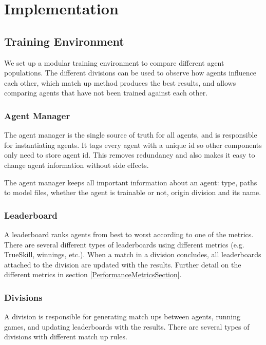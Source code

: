 \chapter{Implementation}

\section{Training Environment}
We set up a modular training environment to compare different agent populations. The different divisions can be used to observe how agents influence each other, which match up method produces the best results, and allows comparing agents that have not been trained against each other. 

\subsection{Agent Manager}
The agent manager is the  single source of truth for all agents, and is responsible for instantiating agents. It tags every agent with a unique id so other components only need to store agent id. This removes redundancy and also makes it easy to change agent information without side effects.

The agent manager keeps all important information about an agent: type, paths to model files, whether the agent is trainable or not, origin division and its name.

\subsection{Leaderboard}
A leaderboard ranks agents from best to worst according to one of the metrics. There are several different types of leaderboards using different metrics (e.g. TrueSkill, winnings, etc.). When a match in a division concludes, all leaderboards attached to the division are updated with the results. Further detail on the different metrics in section \ref{PerformanceMetricsSection}.


\subsection{Divisions}
A division is responsible for generating match ups between agents, running games, and updating leaderboards with the results. There are several types of divisions with different match up rules.

